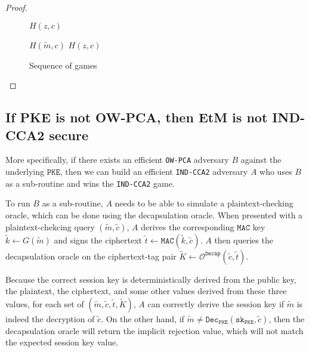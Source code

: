 \documentclass[floatrow,journal=tches,submission]{iacrtrans}
\newcommand{\monospace}{\texttt}
\newcommand{\pke}{\monospace{PKE}}
\newcommand{\decrypt}{\monospace{Dec}}
\newcommand{\decap}{\monospace{Decap}}
\newcommand{\mac}{\monospace{MAC}}
\newcommand{\sk}{\monospace{sk}}
\begin{document}
\begin{proof}
\begin{figure}[H]
\begin{minipage}{0.4\textwidth}
\begin{algorithm}[H]
\begin{algorithmic}[1]
                    \EndIf
                    \State \Return $H(z, c)$
                \end{algorithmic}
            \end{algorithm}
            \begin{algorithm}[H]
                \caption{$\mathcal{O}^\decap_1(c, t)$}\label{alg:etm-decap-oracle-1}
                \begin{algorithmic}[1]
                    \If{$\exists (\tilde{m}, \tilde{k}) \in \mathcal{L}^G :$ \\
                        $\;\;\;\;\decrypt(\sk_\pke, c) = \tilde{m}$ \\
                        $\;\;\;\;\;\land\; \mac(\tilde{k}, c) = t$}
                        \State \Return $H(\tilde{m}, c)$
                    \EndIf
                    \State \Return $H(z, c)$
                \end{algorithmic}
            \end{algorithm}
        \end{minipage}
        \caption{Sequence of games}\label{fig:sequence-of-games}
    \end{figure}

\end{proof}

\subsection{If PKE is not OW-PCA, then EtM is not IND-CCA2 secure}\label{sec:not-owpca-implies-not-indcca2}
More specifically, if there exists an efficient \monospace{OW-PCA} adversary $B$ against the underlying $\pke$, then we can build an efficient \monospace{IND-CCA2} adversary $A$ who uses $B$ as a sub-routine and wins the \monospace{IND-CCA2} game.

To run $B$ as a sub-routine, $A$ needs to be able to simulate a plaintext-checking oracle, which can be done using the decapsulation oracle. When presented with a plaintext-chekcing query $(\tilde{m}, \tilde{c})$, $A$ derives the corresponding $\mac$ key $\tilde{k} \leftarrow G(\tilde{m})$ and signs the ciphertext $\tilde{t} \leftarrow \mac(\tilde{k}, \tilde{c})$. $A$ then queries the decapsulation oracle on the ciphertext-tag pair $\tilde{K} \leftarrow \mathcal{O}^\decap(\tilde{c}, \tilde{t})$.

Because the correct session key is deterministically derived from the public key, the plaintext, the ciphertext, and some other values derived from these three values, for each set of $(\tilde{m}, \tilde{c}, \tilde{t}, \tilde{K})$, $A$ can correctly derive the session key if $\tilde{m}$ is indeed the decryption of $\tilde{c}$. On the other hand, if $\tilde{m} \neq \decrypt_\pke(\sk_\pke, \tilde{c})$, then the decapsulation oracle will return the implicit rejection value, which will not match the expected session key value.
\end{document}
